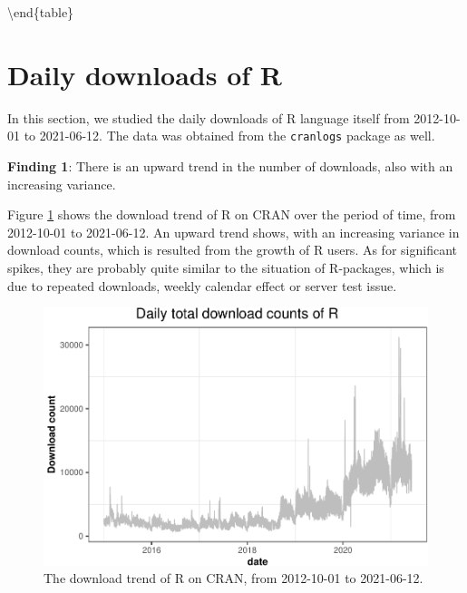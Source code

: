 \documentclass[
]{book}
\newenvironment{discovery}[1]{%
  \begin{tcolorbox}[colback=blue!30,colframe=blue!80!black]#1}{\end{tcolorbox}}
\begin{document}
\textbackslash end\{table\}

\hypertarget{daily-downloads-of-r}{%
\section{Daily downloads of R}\label{daily-downloads-of-r}}

In this section, we studied the daily downloads of R language itself from 2012-10-01 to 2021-06-12. The data was obtained from the \texttt{cranlogs} package \citep{cranlogs} as well.

\begin{discovery}
\textbf{Finding 1}: There is an upward trend in the number of downloads,
also with an increasing variance.
\end{discovery}

Figure \ref{fig:R-download-trend} shows the download trend of R on CRAN over the period of time, from 2012-10-01 to 2021-06-12. An upward trend shows, with an increasing variance in download counts, which is resulted from the growth of R users. As for significant spikes, they are probably quite similar to the situation of R-packages, which is due to repeated downloads, weekly calendar effect or server test issue.



\begin{figure}

{\centering \includegraphics{figures/R-download-trend-1} 

}

\caption{The download trend of R on CRAN, from 2012-10-01 to 2021-06-12.}\label{fig:R-download-trend}
\end{figure}
\end{document}
